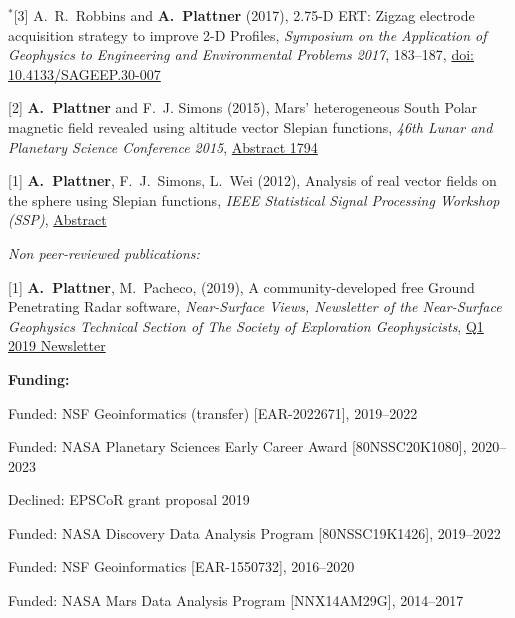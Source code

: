 \documentclass[10pt]{article}
\begin{document}
\spcp
\hspace{-0.67cm}$^*$[3] A.~R.~Robbins and \textbf{A.~Plattner}
(2017),
2.75-D ERT: Zigzag electrode acquisition strategy to improve 2-D
Profiles,
\emph{Symposium on the Application of Geophysics to Engineering and
  Environmental Problems 2017}, 183--187,
\href{http://library.seg.org/doi/pdf/10.4133/SAGEEP.30-007}{doi: 10.4133/SAGEEP.30-007}

\spcp
\hspace{-0.5cm}[2] \textbf{A.~Plattner} and F.~J. Simons (2015),
Mars' heterogeneous South Polar magnetic field revealed using altitude vector Slepian functions,
\emph{46th Lunar and Planetary Science Conference 2015},
\href{http://www.hou.usra.edu/meetings/lpsc2015/pdf/1794.pdf}{Abstract 1794}

\spcp
\hspace{-0.5cm}[1] \textbf{A.~Plattner}, F.~J.~Simons, L.~Wei (2012),
Analysis of real vector fields on the sphere using Slepian functions,
\emph{IEEE Statistical Signal Processing Workshop (SSP)},
\href{http://ieeexplore.ieee.org/stamp/stamp.jsp?tp=&arnumber=6319659}{Abstract}

\spc
\emph{Non peer-reviewed publications:}

\spcp
\hspace{-0.5cm}[1] \textbf{A.~Plattner}, M.~Pacheco, (2019), A
community-developed free Ground Penetrating Radar software,
\emph{Near-Surface Views, Newsletter of the Near-Surface Geophysics
  Technical Section of The Society of Exploration Geophysicists},
\href{https://seg.org/Portals/0/SEG/News%20and%20Resources/Near%20Surface/Near%20Surface%20Newsletter/2011-present/2019_Q1.pdf}{Q1
  2019 Newsletter}


\spc
\textbf{\tsize Funding:}

\spcp
Funded: NSF Geoinformatics (transfer) [EAR-2022671], 2019--2022 

\spcp
Funded: NASA Planetary Sciences Early Career Award [80NSSC20K1080], 2020--2023

\spcp Declined: EPSCoR grant proposal 2019

\spcp
Funded: NASA Discovery Data Analysis Program [80NSSC19K1426], 2019--2022

\spcp
  Funded: NSF Geoinformatics
  [EAR-1550732],
  2016--2020

 \spcp 
Funded: NASA Mars Data Analysis Program [NNX14AM29G], 2014--2017
\end{document}
